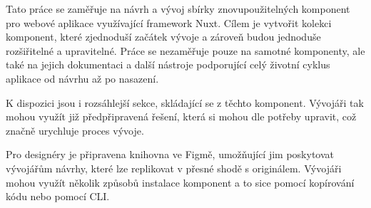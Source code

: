 
Tato práce se zaměřuje na návrh a vývoj sbírky znovupoužitelných komponent pro webové aplikace využívající framework Nuxt.
Cílem je vytvořit kolekci komponent, které zjednoduší začátek vývoje a zároveň budou jednoduše rozšiřitelné a upravitelné.
Práce se nezaměřuje pouze na samotné komponenty, ale také na jejich dokumentaci a další nástroje podporující celý životní
cyklus aplikace od návrhu až po nasazení.

K dispozici jsou i rozsáhlejší sekce, skládající se z těchto komponent. Vývojáři tak mohou využít již předpřipravená řešení,
která si mohou dle potřeby upravit, což značně urychluje proces vývoje.

Pro designéry je připravena knihovna ve Figmě, umožňující jim poskytovat vývojářům návrhy, které lze replikovat v přesné
shodě s originálem. Vývojáři mohou využít několik způsobů instalace komponent a to sice pomocí kopírování kódu nebo pomocí CLI.

